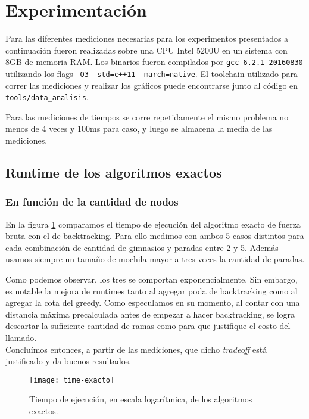 \section{Experimentación}

Para las diferentes mediciones necesarias para los experimentos presentados a continuación fueron realizadas sobre una CPU Intel 5200U en un sistema con 8GB de memoria RAM. Los binarios fueron compilados por \texttt{gcc 6.2.1 20160830} utilizando los flags \texttt{-O3 -std=c++11 -march=native}. El toolchain utilizado para correr las mediciones y realizar los gráficos puede encontrarse junto al código en \texttt{tools/data_analisis}.

Para las mediciones de tiempos se corre repetidamente el mismo problema no menos de 4 veces y 100ms para caso, y luego se almacena la media de las mediciones.

\subsection{Runtime de los algoritmos exactos}

\subsubsection{En función de la cantidad de nodos}

En la figura \ref{fig:time-exacto} comparamos el tiempo de ejecución del algoritmo exacto de fuerza bruta con el de backtracking.
Para ello medimos con ambos 5 casos distintos para cada combinación de cantidad de gimnasios y paradas entre 2 y 5. Además usamos siempre un tamaño de mochila mayor a tres veces la cantidad de paradas.

Como podemos observar, los tres se comportan exponencialmente. Sin embargo, es notable la mejora de runtimes tanto al agregar poda de backtracking como al agregar la cota del greedy. Como especulamos en su momento, al contar con una distancia máxima precalculada antes de empezar a hacer backtracking, se logra descartar la suficiente cantidad de ramas como para que justifique el costo del llamado.
\\

Concluímos entonces, a partir de las mediciones, que dicho \emph{tradeoff} está justificado y da buenos resultados.

\begin{figure}[H]
    \centering
    \texttt{[image: time-exacto]}
    \caption{Tiempo de ejecución, en escala logarítmica, de los algoritmos exactos.}
    \label{fig:time-exacto}
\end{figure}

